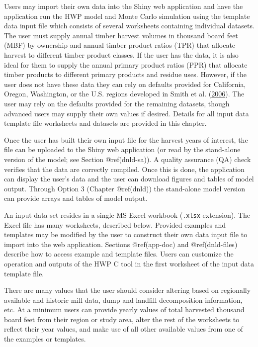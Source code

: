 \documentclass[
  openany]{book}
\begin{document}
Users may import their own data into the Shiny web application and have
the application run the HWP model and Monte Carlo simulation using the
template data input file which consists of several worksheets containing
individual datasets. The user must supply annual timber harvest volumes
in thousand board feet (MBF) by ownership and annual timber product
ratios (TPR) that allocate harvest to different timber product classes.
If the user has the data, it is also ideal for them to supply the annual
primary product ratios (PPR) that allocate timber products to different
primary products and residue uses. However, if the user does not have
these data they can rely on defaults provided for California, Oregon,
Washington, or the U.S. regions developed in Smith et al.
(\protect\hyperlink{ref-smith2006}{2006}). The user may rely on the
defaults provided for the remaining datasets, though advanced users may
supply their own values if desired. Details for all input data template
file worksheets and datasets are provided in this chapter.

Once the user has built their own input file for the harvest years of
interest, the file can be uploaded to the Shiny web application (or read
by the stand-alone version of the model; see Section @ref(dnld-sa)). A
quality assurance (QA) check verifies that the data are correctly
compiled. Once this is done, the application can display the user's data
and the user can download figures and tables of model output. Through
Option 3 (Chapter @ref(dnld)) the stand-alone model version can provide
arrays and tables of model output.

An input data set resides in a single MS Excel workbook (\texttt{.xlsx}
extension). The Excel file has many worksheets, described below.
Provided examples and templates may be modified by the user to construct
their own data input file to import into the web application. Sections
@ref(app-doc) and @ref(dnld-files) describe how to access example and
template files. Users can customize the operation and outputs of the HWP
C tool in the first worksheet of the input data template file.

There are many values that the user should consider altering based on
regionally available and historic mill data, dump and landfill
decomposition information, etc. At a minimum users can provide yearly
values of total harvested thousand board feet from their region or study
area, alter the rest of the worksheets to reflect their year values, and
make use of all other available values from one of the examples or
templates.
\end{document}
